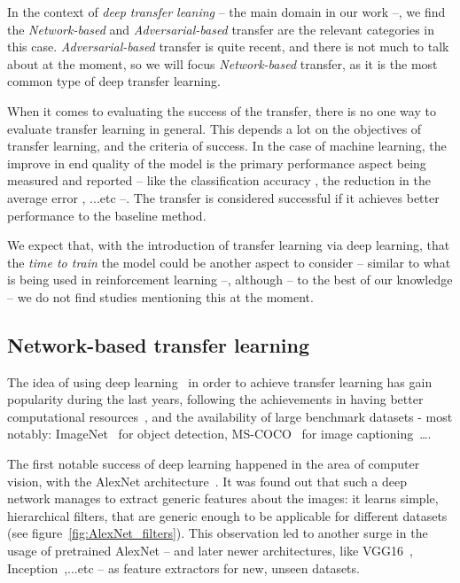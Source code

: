  \par In the context of \textit{deep transfer leaning} -- the main domain in our work --, we find the \textit{Network-based} and \textit{Adversarial-based} transfer are the relevant categories in this case. \textit{Adversarial-based} transfer is quite recent, and there is not much to talk about at the moment, so we will focus \textit{Network-based} transfer, as it is the most common type of deep transfer learning.

  \par When it comes to evaluating the success of the transfer, there is no one way to evaluate transfer learning in general. This depends a lot on the objectives of transfer learning, and the criteria of success. In the case of machine learning, the improve in end quality of the model is the primary performance aspect being measured and reported -- like the classification accuracy \citep{chattopadhyay2012multisource,long2013transfer,pan2010cross,glorot2011domain}, the reduction in the average error \citep{pan2010domain}, ...etc --. The transfer is considered successful if it achieves better performance to the baseline method.

  \par We expect that, with the introduction of transfer learning via deep learning, that the \textit{time to train} the model could be another aspect to consider -- similar to what is being used in reinforcement learning \citep{taylor2007cross} --, although -- to the best of our knowledge -- we do not find studies mentioning this at the moment.

  \subsection{Network-based transfer learning}
    \par The idea of using deep learning~\citep{lecun2015deep} in order to achieve transfer learning has gain popularity during the last years, following the achievements in having better computational resources~\citep{raina2009large}, and the availability of large benchmark datasets - most notably: ImageNet~\citep{imagenet_cvpr09} for object detection, MS-COCO~\citep{2014arXiv1405.0312L} for image captioning~\ldots.

    \par The first notable success of deep learning happened in the area of computer vision, with the AlexNet architecture~\citep{krizhevsky2012imagenet}. It was found out that such a deep network manages to extract generic features about the images: it learns simple, hierarchical filters, that are generic enough to be applicable for different datasets (see figure~\ref{fig:AlexNet_filters}). This observation led to another surge in the usage of pretrained AlexNet -- and later newer architectures, like VGG16~\citep{simonyan2014very}, Inception~\citep{szegedy2015going},...etc -- as feature extractors for new, unseen datasets.

